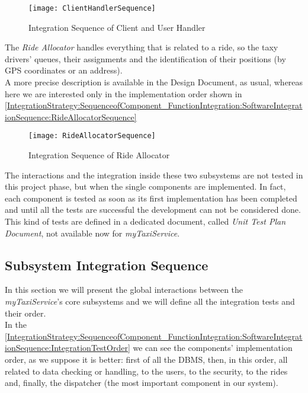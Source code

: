\documentclass[\mainpath/main]{subfiles}
\begin{document}
\begin{figure}[h]
	\centering
	\texttt{[image: ClientHandlerSequence]}
	\caption{Integration Sequence of Client and User Handler}
	\label{IntegrationStrategy:SequenceofComponent_FunctionIntegration:SoftwareIntegrationSequence:ClientHandlerSequence}
\end{figure}

The \textit{Ride Allocator} handles everything that is related to a ride, so the taxy drivers' queues, their assignments and the identification of their positions (by GPS coordinates or an address).\\
A more precise description is available in the Design Document, as usual, whereas here we are interested only in the implementation order shown in \autoref{IntegrationStrategy:SequenceofComponent_FunctionIntegration:SoftwareIntegrationSequence:RideAllocatorSequence}

\begin{figure}[h]
	\centering
	\texttt{[image: RideAllocatorSequence]}
	\caption{Integration Sequence of Ride Allocator}
	\label{IntegrationStrategy:SequenceofComponent_FunctionIntegration:SoftwareIntegrationSequence:RideAllocatorSequence}
\end{figure}

The interactions and the integration inside these two subsystems are not tested in this project phase, but when the single components are implemented. In fact, each component is tested as soon as its first implementation has been completed and until all the tests are successful the development can not be considered done.\\
This kind of tests are defined in a dedicated document, called \textit{Unit Test Plan Document}, not available now for \textit{myTaxiService}.

\subsection{Subsystem Integration Sequence}
\label{IntegrationStrategy:SequenceofComponent_FunctionIntegration:SubsystemIntegrationSequence}
In this section we will present the global interactions between the \textit{myTaxiService}'s core subsystems and we will define all the integration tests and their order.\\
In the \autoref{IntegrationStrategy:SequenceofComponent_FunctionIntegration:SoftwareIntegrationSequence:IntegrationTestOrder} we can see the components' implementation order, as we suppose it is better: first of all the DBMS, then, in this order, all related to data checking or handling, to the users, to the security, to the rides and, finally, the dispatcher (the most important component in our system).
\end{document}
